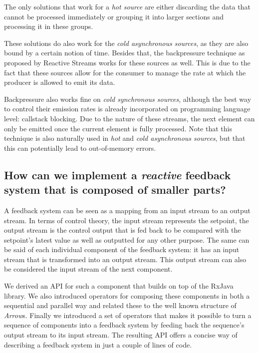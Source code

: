 The only solutions that work for a \textit{hot source} are either discarding the data that cannot be processed immediately or grouping it into larger sections and processing it in these groups.

These solutions do also work for the \textit{cold asynchronous sources}, as they are also bound by a certain notion of time. Besides that, the backpressure technique as proposed by Reactive Streams works for these sources as well. This is due to the fact that these sources allow for the consumer to manage the rate at which the producer is allowed to emit its data.

Backpressure also works fine on \textit{cold synchronous sources}, although the best way to control their emission rates is already incorporated on programming language level: callstack blocking. Due to the nature of these streams, the next element can only be emitted once the current element is fully processed. Note that this technique is also naturally used in \textit{hot} and \textit{cold asynchronous sources}, but that this can potentially lead to out-of-memory errors.

\subsection*{How can we implement a \textit{reactive} feedback system that is composed of smaller parts?}
A feedback system can be seen as a mapping from an input stream to an output stream. In terms of control theory, the input stream represents the setpoint, the output stream is the control output that is fed back to be compared with the setpoint's latest value as well as outputted for any other purpose. The same can be said of each individual component of the feedback system: it has an input stream that is transformed into an output stream. This output stream can also be considered the input stream of the next component.

We derived an API for such a component that builds on top of the RxJava library. We also introduced operators for composing these components in both a sequential and parallel way and related these to the well known structure of \textit{Arrow}s. Finally we introduced a set of operators that makes it possible to turn a sequence of components into a feedback system by feeding back the sequence's output stream to its input stream. The resulting API offers a concise way of describing a feedback system in just a couple of lines of code.

